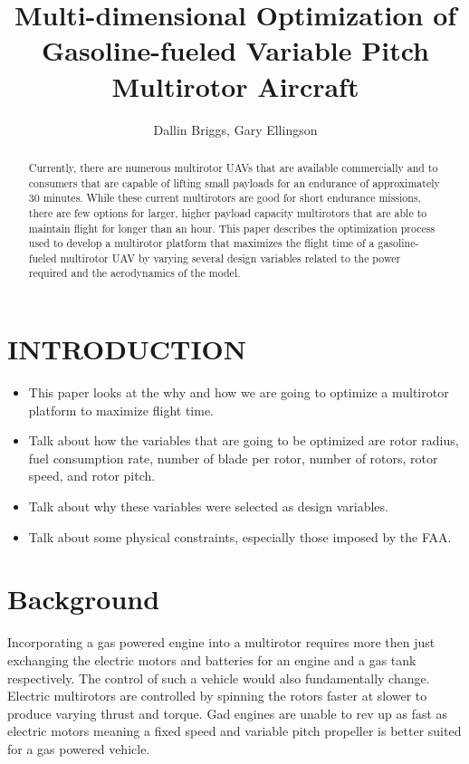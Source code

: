 \documentclass[letterpaper, 10 pt, conference]{ieeeconf}  %
\title{\LARGE \bf
Multi-dimensional Optimization of Gasoline-fueled Variable Pitch Multirotor Aircraft
}
\author{Dallin Briggs, Gary Ellingson%
}
\begin{document}
\maketitle
\thispagestyle{empty}
\pagestyle{empty}


\begin{abstract}

Currently, there are numerous multirotor UAVs that are available commercially and to consumers that are capable of lifting small payloads for an endurance of approximately 30 minutes. While these current multirotors are good for short endurance missions, there are few options for larger, higher payload capacity multirotors that are able to maintain flight for longer than an hour. This paper describes the optimization process used to develop a multirotor platform that maximizes the flight time of a gasoline-fueled multirotor UAV by varying several design variables related to the power required and the aerodynamics of the model.

\end{abstract}


\section{INTRODUCTION}

\begin{itemize}
	\item{This paper looks at the why and how we are going to optimize a multirotor platform to maximize flight time.}
	\item{Talk about how the variables that are going to be optimized are rotor radius, fuel consumption rate, number of blade per rotor, number of rotors, rotor speed, and rotor pitch.}
	\item{Talk about why these variables were selected as design variables.}
	\item{Talk about some physical constraints, especially those imposed by the FAA.}
\end{itemize}


\section{Background}

Incorporating a gas powered engine into a multirotor requires more then just exchanging the electric motors and batteries for an engine and a gas tank respectively. The control of such a vehicle would also fundamentally change.  Electric multirotors are controlled by spinning the rotors faster at slower to produce varying thrust and torque. Gad engines are unable to rev up as fast as electric motors meaning a fixed speed and variable pitch propeller is better suited for a gas powered vehicle.
\end{document}
